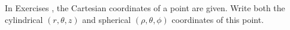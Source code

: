 {\noindent In Exercises} 
{,  the Cartesian coordinates of a point are given.  Write both the cylindrical $(r,\theta,z)$ and spherical $(\rho, \theta, \phi)$ coordinates of this point.
}
